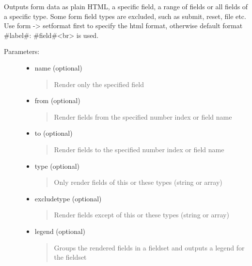 \documentclass[letterpaper,10pt,english]{sphinxmanual}
\begin{document}
\begin{fulllineitems}

\begin{fulllineitems}
Outputs form data as plain HTML, a specific field, a range of fields or all fields of a specific type.
Some form field types are excluded, such as submit, reset, file etc.
Use form -\textgreater{} setformat first to specify the html format, otherwise default format \#label\#: \#field\#\textless{}br\textgreater{} is used.
\begin{description}
\item[{Parameters:}] \leavevmode\begin{itemize}
\item {} 
name (optional)
\begin{quote}

Render only the specified field
\end{quote}

\item {} 
from (optional)
\begin{quote}

Render fields from the specified number index or field name
\end{quote}

\item {} 
to (optional)
\begin{quote}

Render fields to the specified number index or field name
\end{quote}

\item {} 
type (optional)
\begin{quote}

Only render fields of this or these types (string or array)
\end{quote}

\item {} 
excludetype (optional)
\begin{quote}

Render fields except of this or these types (string or array)
\end{quote}

\item {} 
legend (optional)
\begin{quote}

Groups the rendered fields in a fieldset and outputs a legend for the fieldset
\end{quote}


\end{itemize}
\end{description}
\end{fulllineitems}
\end{fulllineitems}
\end{document}
